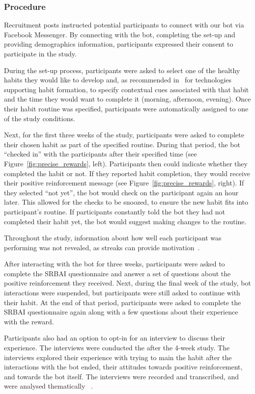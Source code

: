 \documentclass{scaffold/sigchi}
\begin{document}
\subsubsection{Procedure}
Recruitment posts instructed potential participants to connect with our bot via Facebook Messenger. By connecting with the bot, completing the set-up and providing demographics information, participants expressed their consent to participate in the study.

During the set-up process, participants were asked to select one of the healthy habits they would like to develop and, as recommended in~\cite{article_dont_forget_your_pill} for technologies supporting habit formation, to specify contextual cues associated with that habit and the time they would want to complete it (morning, afternoon, evening). Once their habit routine was specified, participants were automatically assigned to one of the study conditions. 

Next, for the first three weeks of the study, participants were asked to complete their chosen habit as part of the specified routine. During that period, the bot ``checked in'' with the participants after their specified time (see Figure~\ref{fig:precise_rewards}, left). Participants then could indicate whether they completed the habit or not. If they reported habit completion, they would receive their positive reinforcement message (see Figure~\ref{fig:precise_rewards}, right). If they selected ``not yet'', the bot would check on the participant again an hour later. This allowed for the checks to be snoozed, to ensure the new habit fits into participant's routine. If participants constantly told the bot they had not completed their habit yet, the bot would suggest making changes to the routine.

Throughout the study, information about how well each participant was performing was not revealed, as streaks can provide motivation~\cite{article_dont_kick_habit}. 

After interacting with the bot for three weeks, participants were asked to complete the SRBAI questionnaire and answer a set of questions about the positive reinforcement they received. Next, during the final week of the study, bot interactions were suspended, but participants were still asked to continue with their habit. At the end of that period, participants were asked to complete the SRBAI questionnaire again along with a few questions about their experience with the reward. 

Participants also had an option to opt-in for an interview to discuss their experience. The interviews were conducted the after the 4-week study. The interviews explored their experience with trying to main the habit after the interactions with the bot ended, their attitudes towards positive reinforcement, and towards the bot itself. The interviews were recorded and transcribed, and were analysed thematically ~\cite{thematic_analysis_qualatitive_data}. 
\end{document}
